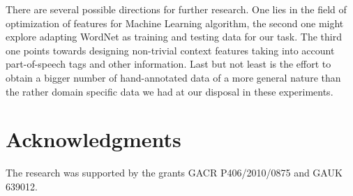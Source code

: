 \documentclass[letterpaper]{article}
\begin{document}
There are several possible directions for further research. One lies in the field of
optimization of features for Machine Learning algorithm, the second one might explore 
adapting WordNet as training and testing data for our task. The third one points towards
designing non-trivial context features taking into account part-of-speech tags and other information.
Last but not least is the effort to obtain a bigger number of hand-annotated data of a more general nature than 
the rather domain specific data we had at our disposal in these experiments. 
 

\section*{Acknowledgments}

The research was supported by the grants GACR P406/2010/0875 and GAUK 639012.

 
\end{document}
